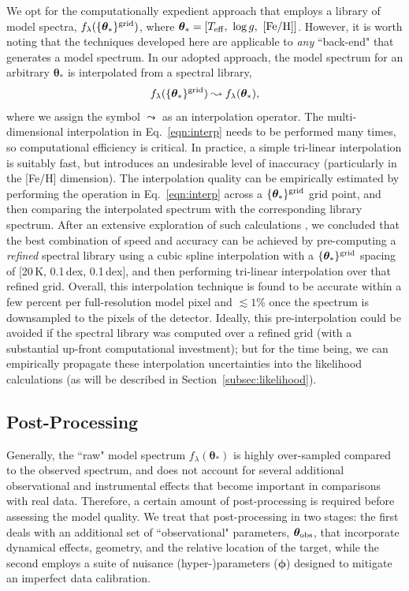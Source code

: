 \documentclass[iop,floatfix]{emulateapj}
\newcommand{\flam}{f_\lambda}
\newcommand{\vt}{ {\bm \theta}}
\newcommand{\vp}{ {\bm \phi}}
\begin{document}
We opt for the computationally expedient approach that employs a library of model spectra, 
$\flam(\{\vt_{\ast}\}^{\rm grid})$, where $\vt_{\ast} = [T_{\rm eff}, \,\, \log{g}, \,\, 
[{\rm Fe/H}]]$.  However, it is worth noting that the techniques developed here are applicable to 
{\it any} ``back-end" that generates a model spectrum.  In our adopted approach, the model 
spectrum for an arbitrary $\vt_{\ast}$ is interpolated from a spectral library, 
\begin{equation} \label{eqn:interp}
\flam(\{\vt_{\ast}\}^{\rm grid}) \leadsto \flam(\vt_{\ast}),
\end{equation}
where we assign the symbol $\leadsto$ as an interpolation operator.  The multi-dimensional 
interpolation in Eq.~\ref{eqn:interp} needs to be performed many times, so computational efficiency 
is critical.  In practice, a simple tri-linear interpolation is suitably fast, but introduces an 
undesirable level of inaccuracy (particularly in the [Fe/H] dimension).  The interpolation quality 
can be empirically estimated by performing the operation in Eq.~\ref{eqn:interp} across a 
$\{\vt_{\ast}\}^{\rm grid}$ grid point, and then comparing the interpolated spectrum with the 
corresponding library spectrum.  After an extensive exploration of such calculations 
\citep[see also][]{husser12}, we concluded that the best combination of speed and accuracy can be 
achieved by pre-computing a {\it refined} spectral library using a cubic spline interpolation with 
a $\{\vt_{\ast}\}^{\rm grid}$ spacing of [20\,K, 0.1\,dex, 0.1\,dex], and then performing 
tri-linear interpolation over that refined grid.  Overall, this interpolation
technique is found to be accurate within a few percent per full-resolution
model pixel and $\lesssim 1$\% once the spectrum is downsampled to the pixels of the detector. Ideally,
this pre-interpolation could be avoided if the spectral library was computed
over a refined grid (with a substantial up-front computational investment); but
for the time being, we can empirically propagate these interpolation
uncertainties into the likelihood calculations (as will be described in 
Section~\ref{subsec:likelihood}).  

\subsection{Post-Processing} \label{subsec:postprocess}

Generally, the ``raw" model spectrum $\flam(\vt_{\ast})$ is highly over-sampled compared to the 
observed spectrum, and does not account for several additional observational and 
instrumental effects that become important in comparisons with real data.  Therefore, a certain 
amount of post-processing is required before assessing the model quality.  We treat that 
post-processing in two stages: the first deals with an additional set of ``observational" 
parameters, $\vt_{\rm obs}$, that incorporate dynamical effects, geometry, and the relative 
location of the target, while the second employs a suite of nuisance (hyper-)parameters ($\vp$) 
designed to mitigate an imperfect data calibration.
\end{document}
